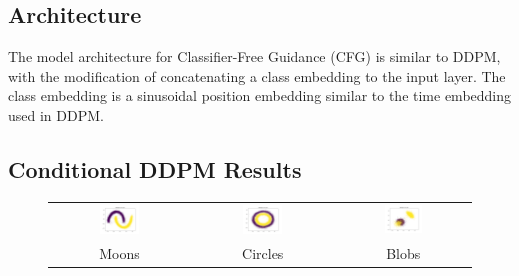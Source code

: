 \documentclass[11pt]{article}
\begin{document}
\subsection{Architecture}

The model architecture for Classifier-Free Guidance (CFG) is similar to DDPM, with the modification of concatenating a class embedding to the input layer. The class embedding is a sinusoidal position embedding similar to the time embedding used in DDPM.

\subsection{Conditional DDPM Results}

\begin{figure}[H]
    \centering
    \begin{tabular}{ccc}
        \includegraphics[width=0.3\textwidth]{exps/ddpm_2_150_0.0001_0.02_moons/samples_conditional_150.png} &
        \includegraphics[width=0.3\textwidth]{exps/ddpm_2_150_0.0001_0.02_circles/samples_conditional_150.png} &
        \includegraphics[width=0.3\textwidth]{exps/ddpm_2_150_0.0001_0.02_blobs/samples_conditional_150.png} \\
        Moons & Circles & Blobs \\[0.5em]
        

\end{tabular}
\end{figure}
\end{document}
